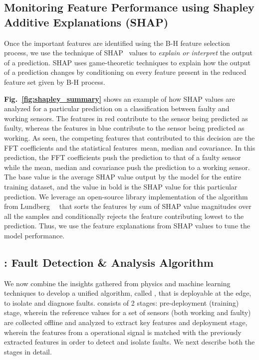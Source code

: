 




\subsection{Monitoring Feature Performance using Shapley Additive Explanations (SHAP)} \label{subsec:shap} Once the important features are identified using the B-H feature selection process, we use the technique of SHAP~\cite{NIPS2017_8a20a862} values to \textit{explain or interpret} the output of a prediction. SHAP uses game-theoretic techniques to explain how the output of a prediction changes by conditioning on every feature present in the reduced feature set given by B-H process.  




{\bfseries Fig.~\ref{fig:shapley_summary}} shows an example of how SHAP values are analyzed for a particular prediction on a classification between faulty and working sensors. The features in red contribute to the sensor being predicted as faulty, whereas the features in blue contribute to the sensor being predicted as working. As seen, the competing features that contributed to this decision are the FFT coefficients and the statistical features~\viz mean, median and covariance. 
In this prediction, the FFT coefficients push the prediction to that of a faulty sensor while the mean, median and covariance push the prediction to a working sensor. The base value is the average SHAP value output by the model for the entire training dataset, and the value in bold is the SHAP value for this particular prediction. We leverage an open-source library implementation of the algorithm from Lundberg~\etal~\cite{NIPS2017_8a20a862, shap_implementation} that sorts the features by sum of SHAP value magnitudes over all the samples and conditionally rejects the feature contributing lowest to the prediction. Thus, we use the feature explanations from SHAP values to tune the model performance. %

\subsection{\sol: Fault Detection \& Analysis Algorithm}
\label{subsec:high_level_algorithm}
We now combine the insights gathered from physics and machine learning techniques to develop a unified algorithm, called \sol, that is deployable at the edge, to isolate and diagnose faults.
\sol consists of 2 stages: \ci pre-deployment (training) stage, wherein the reference \aout values for a set of sensors (both working and faulty) are collected offline and analyzed to extract key features and \cii deployment stage, wherein the features from a operational \aout signal is matched with the previously extracted features in order to detect and isolate faults. We next describe both the stages in detail.

